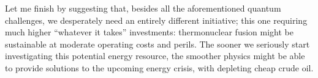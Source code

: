 \documentclass[%
 preprint,
 showpacs,
 showkeys,
 preprintnumbers,
 amsmath,amssymb,
 aps,
  pra,
  longbibliography,
 ]{revtex4-1}
\begin{document}
Let me finish by suggesting that, besides all the aforementioned quantum challenges,
we desperately need an entirely different initiative;
this one requiring much higher ``whatever it takes'' investments:
thermonuclear fusion might be
sustainable at moderate operating costs and perils.
The sooner we seriously start investigating this potential energy resource,
the smoother physics might be able to provide solutions
to the upcoming energy crisis, with depleting cheap crude oil.





%
\end{document}
